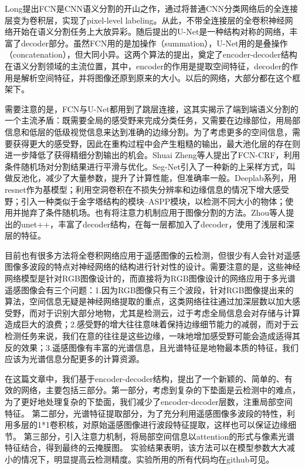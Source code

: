 \documentclass[UTF8]{ctexart}
\begin{document}
Long提出FCN\cite{FCN}是CNN语义分割的开山之作，通过将普通CNN分类网络后的全连接层变为卷积层，实现了pixel-level labeling。从此，不带全连接层的全卷积神经网络开始在语义分割任务上大放异彩。随后提出的U-Net\cite{ronneberger2015unet}是一种结构对称的网络，丰富了decoder部分。虽然FCN用的是加操作（summation），U-Net用的是叠操作（concatenation），但大同小异。这两个算法的提出，奠定了encoder-decoder结构在语义分割领域的主流位置，其中，encoder的作用是提取空间特征，decoder的作用是解析空间特征，并将图像还原到原来的大小。以后的网络，大部分都在这个框架下。

需要注意的是，FCN与U-Net都用到了跳层连接，这其实揭示了端到端语义分割的一个主流矛盾：既需要全局的感受野来完成分类任务，又需要在边缘部位，用局部信息和低层的低级视觉信息来达到准确的边缘分割。为了考虑更多的空间信息，需要获得更大的感受野，因此在重构过程中会产生粗糙的输出，最大池化层的存在则进一步降低了获得精细分割输出的机会。Shuai Zheng等人\cite{zheng2015conditional}提出了FCN-CRF，利用条件随机场对分割结果进行平滑与优化。Seg-Net\cite{badrinarayanan2015segnet}引入了一种新的上采样方式，叫做反池化，减少了大量参数，提升了计算性能，但准确率一般。Deeplab\cite{chen2014semantic, chen2017deeplab, chen2017rethinking}系列，用resnet作为基模型；利用空洞卷积在不损失分辨率和边缘信息的情况下增大感受野；引入一种类似于金字塔结构的模块--ASPP模块，以检测不同大小的物体；使用并抛弃了条件随机场。也有将注意力机制应用于图像分割的方法\cite{zhang2018context, li2018pyramid, oktay2018attention}。Zhou等人\cite{zhou2018unet++}提出的unet++，丰富了decoder结构，在每一层都加入了decoder，使用了浅层和深层的特征。

目前也有很多方法将全卷积网络应用于遥感图像的云检测\cite{chai2019cloud, jeppesen2019cloud}，但很少有人会针对遥感图像多波段的特点对神经网络的结构进行针对性的设计。需要注意的是，这些神经网络模型是针对RGB图像设计的，而直接将为RGB图像设计的网络应用于多光谱遥感图像会有三个问题：1.因为RGB图像只有三个波段，针对RGB图像提出来的算法，空间信息无疑是神经网络提取的重点，这类网络往往通过加深层数以加大感受野，而对于识别大部分地物，尤其是检测云，过于考虑全局信息会对存储与计算造成巨大的浪费；2.感受野的增大往往意味着保持边缘细节能力的减弱，而对于云检测任务来说，我们在意的往往是这些边缘，一味地增加感受野可能会造成适得其反的效果；3.遥感图像有丰富的光谱信息，且光谱特征是地物最本质的特征，我们应该为光谱信息分配更多的计算资源。

在这篇文章中，我们基于encoder-decoder结构，提出了一个新颖的、简单的、有效的网络，主要包括三部分。第一部分，考虑到复杂的下垫面是云检测中的难点，为了更好地处理复杂的下垫面，我们减少了encoder-decoder层数，注重局部空间特征。
第二部分，光谱特征提取部分，为了充分利用遥感图像多波段的特性，利用多层的1*1卷积核，对原始遥感图像进行波段特征提取，这样也可以保证边缘细节。
第三部分，引入注意力机制，将局部空间信息以attention的形式与像素光谱特征结合，得到最终的云掩膜图。
实验结果表明，该方法可以在模型参数大大减小的情况下，明显提高云检测精度。实验所用的所有代码均在github可见。
\end{document}
